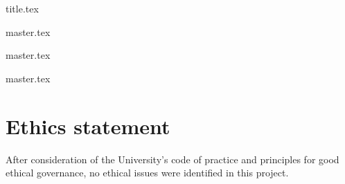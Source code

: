 \documentclass[a4paper, 12pt]{report}
\begin{document}
{title.tex}



\setcounter{tocdepth}{4}



\tableofcontents

\newpage

\listoffigures

\newpage

\listoftables


% 





\newpage



{master.tex}


{master.tex}



{master.tex}






\chapter{Ethics statement}

After consideration of the University's code of practice and principles for good ethical governance, no ethical issues were identified in this project. 


\newpage






\end{document}
